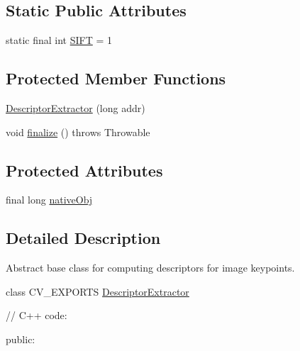 \subsection*{Static Public Attributes}
\begin{DoxyCompactItemize}
\item 
static final int \mbox{\hyperlink{classorg_1_1opencv_1_1features2d_1_1_descriptor_extractor_a5e5b1fabe0cb02e586331914421ef495}{S\+I\+FT}} = 1
\end{DoxyCompactItemize}
\subsection*{Protected Member Functions}
\begin{DoxyCompactItemize}
\item 
\mbox{\hyperlink{classorg_1_1opencv_1_1features2d_1_1_descriptor_extractor_a59eb1d9c4273594cc3d925e3ec3ed70f}{Descriptor\+Extractor}} (long addr)
\item 
void \mbox{\hyperlink{classorg_1_1opencv_1_1features2d_1_1_descriptor_extractor_a4052f36afab6c14392994eaae66c79db}{finalize}} ()  throws Throwable 
\end{DoxyCompactItemize}
\subsection*{Protected Attributes}
\begin{DoxyCompactItemize}
\item 
final long \mbox{\hyperlink{classorg_1_1opencv_1_1features2d_1_1_descriptor_extractor_abe19e832e72a6c51ebae5099e7378941}{native\+Obj}}
\end{DoxyCompactItemize}


\subsection{Detailed Description}
Abstract base class for computing descriptors for image keypoints.

class C\+V\+\_\+\+E\+X\+P\+O\+R\+TS \mbox{\hyperlink{classorg_1_1opencv_1_1features2d_1_1_descriptor_extractor}{Descriptor\+Extractor}} {\ttfamily }

{\ttfamily }

{\ttfamily }

{\ttfamily // C++ code\+:}

{\ttfamily }

{\ttfamily }

{\ttfamily public\+:}

